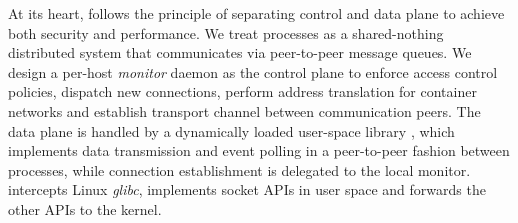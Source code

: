 





At its heart, \sys{} follows the principle of separating control and data plane to achieve both security and performance.
We treat processes as a shared-nothing distributed system that communicates via peer-to-peer message queues.
We design a per-host \emph{monitor} daemon as the control plane to enforce access control policies, dispatch new connections, perform address translation for container networks and establish transport channel between communication peers.
The data plane is handled by a dynamically loaded user-space library \libipc{}, which implements data transmission and event polling in a peer-to-peer fashion between processes, while connection establishment is delegated to the local monitor.
\libipc{} intercepts Linux \emph{glibc}, implements socket APIs in user space and forwards the other APIs to the kernel.

